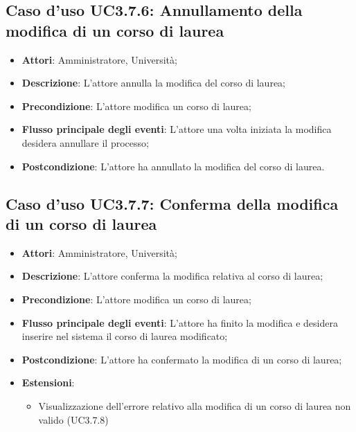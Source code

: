 \subsection{Caso d'uso \texorpdfstring{UC3.7.6}{UC3.7.6}: Annullamento della modifica di un corso di laurea}
\begin{itemize}
\item \textbf{Attori}: Amministratore, Università;
\item \textbf{Descrizione}: L'attore annulla la modifica del corso di laurea;

\item \textbf{Precondizione}: L'attore modifica un corso di laurea;

\item \textbf{Flusso principale degli eventi}: L'attore una volta iniziata la modifica desidera annullare il processo;

\item \textbf{Postcondizione}: L'attore ha annullato la modifica del corso di laurea.

\end{itemize}
\subsection{Caso d'uso \texorpdfstring{UC3.7.7}{UC3.7.7}: Conferma della modifica di un corso di laurea}
\begin{itemize}
\item \textbf{Attori}: Amministratore, Università;
\item \textbf{Descrizione}: L'attore conferma la modifica relativa al corso di laurea;

\item \textbf{Precondizione}: L'attore modifica un corso di laurea;

\item \textbf{Flusso principale degli eventi}: L'attore ha finito la modifica e desidera inserire nel sistema il corso di laurea modificato;

\item \textbf{Postcondizione}: L'attore ha confermato la modifica di un corso di laurea;

\item \textbf{Estensioni}:
\begin{itemize}
\item Visualizzazione dell'errore relativo alla modifica di un corso di laurea non valido (UC3.7.8)
\end{itemize}
\end{itemize}
